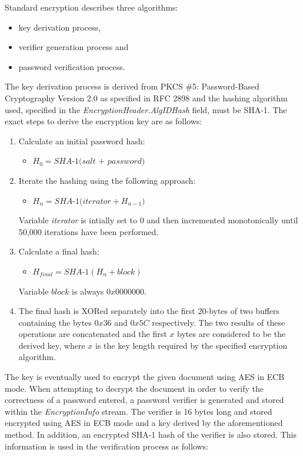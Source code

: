 \documentclass[11pt,oneside]{fithesis2}
\begin{document}
Standard encryption describes three algorithms:
\begin{itemize}
	\setlength\itemsep{0.1em}
	\item{key derivation process,}
	\item{verifier generation process and}
	\item{password verification process.}
\end{itemize}

The key derivation process is derived from PKCS \#5: Password-Based Cryptography Version 2.0 as specified in RFC 2898 \cite{rfc2898} and the hashing algorithm used, specified in the \textit{EncryptionHeader.AlgIDHash} field, must be SHA-1. The exact steps to derive the encryption key are as follows:

\begin{enumerate}
\item{Calculate an initial password hash:}
	\begin{itemize}
		\item{$H_0 =\textit{SHA-1(salt + password)}$}
	\end{itemize}
\item{Iterate the hashing using the following approach: 
	\begin{itemize}
		\item{$H_n = \textit{SHA-1(iterator} + H_{n-1})$}
	\end{itemize}
	Variable \textit{iterator} is intially set to 0 and then incremented monotonically until 50,000 iterations have been performed.}
\item{Calculate a final hash:
	\begin{itemize}
		\item{$H_{final} = \textit{SHA-1}(H_n + block)$}
	\end{itemize}
	Variable $block$ is always $0x0000000$.}
\item{The final hash is XORed separately into the first 20-bytes of two buffers containing the bytes $0x36$ and $0x5C$ respectively. The two results of these operations are concatenated and the first $x$ bytes are considered to be the derived key, where $x$ is the key length required by the specified encryption algorithm.}
\end{enumerate}

The key is eventually used to encrypt the given document using AES in ECB mode. When attempting to decrypt the document in order to verify the correctness of a password entered, a password verifier is generated and stored within the \textit{EncryptionInfo} stream. The verifier is 16 bytes long and stored encrypted using AES in ECB mode and a key derived by the aforementioned method. In addition, an encrypted SHA-1 hash of the verifier is also stored. This information is used in the verification process as follows:
\end{document}
